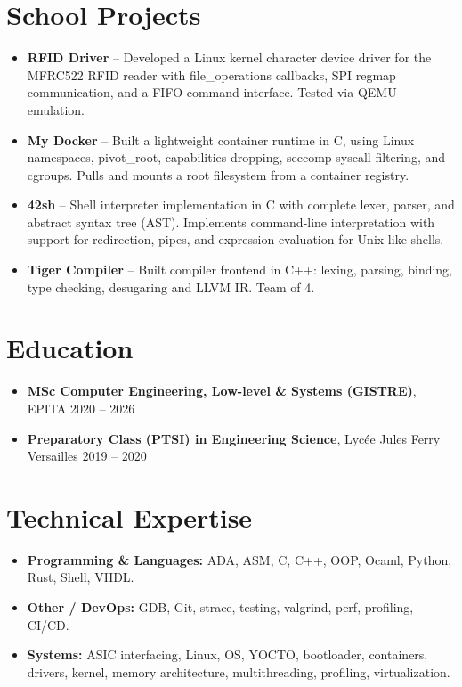 \documentclass[9pt,a4paper]{article}
\begin{document}
\section*{School Projects}
\begin{tcolorbox}[mybox]
\begin{itemize}
\item \textbf{RFID Driver} -- Developed a Linux kernel character device driver for the MFRC522 RFID reader with file\_operations callbacks, SPI regmap communication, and a FIFO command interface. Tested via QEMU emulation.

\item \textbf{My Docker} -- Built a lightweight container runtime in C, using Linux namespaces, pivot\_root, capabilities dropping, seccomp syscall filtering, and cgroups. Pulls and mounts a root filesystem from a container registry.

\item \textbf{42sh} -- Shell interpreter implementation in C with complete lexer, parser, and abstract syntax tree (AST). Implements command-line interpretation with support for redirection, pipes, and expression evaluation for Unix-like shells.

\item \textbf{Tiger Compiler} -- Built compiler frontend in C++: lexing, parsing, binding, type checking, desugaring and LLVM IR. Team of 4.
\end{itemize}
\end{tcolorbox}


\section*{Education}
\begin{tcolorbox}[mybox]
\begin{itemize}
\item \textbf{MSc Computer Engineering, Low-level \& Systems (GISTRE)}, EPITA {\small{\hfill 2020 – 2026}}

\item \textbf{Preparatory Class (PTSI) in Engineering Science}, Lycée Jules Ferry Versailles {\small{\hfill 2019 – 2020}}
\end{itemize}
\end{tcolorbox}


\section*{Technical Expertise}
\begin{tcolorbox}[mybox]
\begin{itemize}
\item \textbf{Programming \& Languages:} ADA, ASM, C, C++, OOP, Ocaml, Python, Rust, Shell, VHDL.

\item \textbf{Other / DevOps:} GDB, Git, strace, testing, valgrind, perf, profiling, CI/CD.

\item \textbf{Systems:} ASIC interfacing, Linux, OS, YOCTO, bootloader, containers, drivers, kernel, memory architecture, multithreading, profiling, virtualization.
\end{itemize}
\end{tcolorbox}
\end{document}
